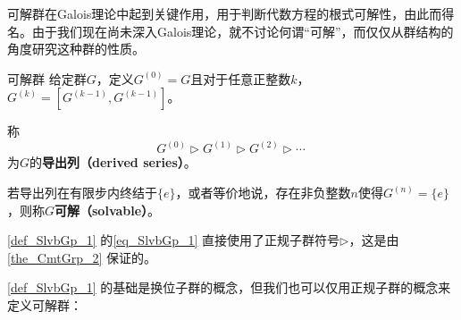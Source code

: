 



可解群在Galois理论中起到关键作用，用于判断代数方程的根式可解性，由此而得名。由于我们现在尚未深入Galois理论，就不讨论何谓“可解”，而仅仅从群结构的角度研究这种群的性质。


\begin{definition}{可解群}\label{def_SlvbGp_1}
给定群$G$，定义$G^{(0)}=G$且对于任意正整数$k$，$G^{(k)}=[G^{(k-1)}, G^{(k-1)}]$。

称
\begin{equation}\label{eq_SlvbGp_1}
G^{(0)}\rhd G^{(1)}\rhd G^{(2)}\rhd \cdots~
\end{equation}
为$G$的\textbf{导出列（derived series）}。

若导出列在有限步内终结于$\{e\}$，或者等价地说，存在非负整数$n$使得$G^{(n)}=\{e\}$，则称$G$\textbf{可解（solvable）}。

\end{definition}


\autoref{def_SlvbGp_1} 的\autoref{eq_SlvbGp_1} 直接使用了正规子群符号$\rhd$，这是由\autoref{the_CmtGrp_2} 保证的。



\autoref{def_SlvbGp_1} 的基础是换位子群的概念，但我们也可以仅用正规子群的概念来定义可解群：




































